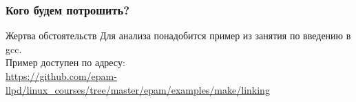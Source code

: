 
\begin{frame}
	\frametitle{Кого будем потрошить?}

	\begin{block}{Жертва обстоятельств}
		Для анализа понадобится пример из занятия по введению в gcc.\\
		Пример доступен по адресу:\\
		 \url{https://github.com/epam-llpd/linux\_courses/tree/master/epam/examples/make/linking}
	\end{block}
\end{frame}
